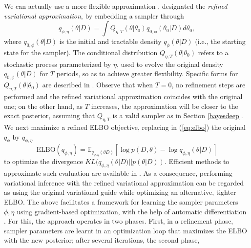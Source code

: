 We can actually use a more flexible approximation \citep{VIS},
 designated the {\em refined variational approximation}, 
  by embedding a sampler through
\begin{equation*}\label{eq:q}
q_{\phi,\eta}(\theta |D) = \int Q_{\eta, T}(\theta  | \theta _0)q_{0,\phi}(\theta _0|D)d\theta _0,
\end{equation*}
where $q_{0,\phi} (\theta | D)$ is the initial and tractable density
$q_{\phi} (\theta | D)$
(i.e., the starting state for the sampler). 
The conditional distribution $Q_{\eta, T}(\theta |\theta _0)$ refers
to a stochastic process parameterized by $\eta$,  
used to evolve the original density $q_{0,\phi}(\theta |D )$
for $T$ periods, so as to achieve greater flexibility. Specific 
forms for $Q_{\eta, T}(\theta |\theta _0)$
are described in \cite{VIS}.
 Observe that when $T=0$, no refinement steps are performed and the refined variational approximation coincides with the original one; on the other hand, as 
 $T$ increases, the approximation will be closer to the exact posterior, assuming that $Q_{\eta, T}$ is a valid sampler
 as in Section \ref{bayesdeep}.
We next maximize a refined ELBO objective, replacing in (\ref{eq:elbo}) the 
original $q_{\phi }$ 
by $q_{\phi, \eta}$
\begin{equation}\label{eq:ELBO}
\mbox{ELBO}(q_{\phi,\eta}) = \mathbb{E}_{q_{\phi, \eta}(\theta D)}
\left[ \log p(D, \theta ) - \log q_{\phi, \eta}(\theta |D)\right]
\end{equation}
to optimize the divergence $KL(q_{\phi,\eta}(\theta |D) ||  p(\theta |D ))$. 
Efficient methods to approximate 
 such 
evaluation are available in \cite{VIS}. As a consequence, performing variational inference with the refined variational approximation can be regarded as using the original variational guide while optimizing an alternative, tighter ELBO.  
The above facilitates a framework for learning the sampler parameters $\phi, \eta$ using gradient-based optimization, with the help of automatic differentiation \citep{baydin2017automatic}.
For this, the approach operates in two phases.
First, in a refinement phase, sampler parameters are learnt in an optimization loop that maximizes the ELBO with the new posterior;
after several iterations, the second phase,
